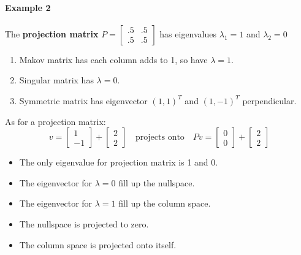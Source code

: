 \documentclass{article}
\begin{document}
\paragraph{Example 2}
The \textbf{projection matrix} $P = \begin{bmatrix} .5 & .5 \\ .5 & .5
	\end{bmatrix}$ has eigenvalues $\lambda_1 = 1$ and $\lambda_2 = 0$
\begin{enumerate}
	\item Makov matrix has each column adds to 1, so have $\lambda = 1$.
	\item Singular matrix has $\lambda = 0$.
	\item Symmetric matrix has eigenvector $(1, 1)^T$ and $(1, -1)^T$ perpendicular.
\end{enumerate}

As for a projection matrix:
\[
	v =
	\begin{bmatrix}
		1 \\
		-1
	\end{bmatrix}
	+
	\begin{bmatrix}
		2 \\
		2
	\end{bmatrix}
	\quad \text{projects onto} \quad
	Pv =
	\begin{bmatrix}
		0 \\
		0
	\end{bmatrix}
	+
	\begin{bmatrix}
		2 \\
		2
	\end{bmatrix}
\]

\begin{itemize}
	\item The only eigenvalue for projection matrix is 1 and 0.
	\item The eigenvector for $\lambda = 0$ fill up the nullspace.
	\item The eigenvector for $\lambda = 1$ fill up the column space.
	\item The nullspace is projected to zero.
	\item The column space is projected onto itself.
\end{itemize}
\end{document}
